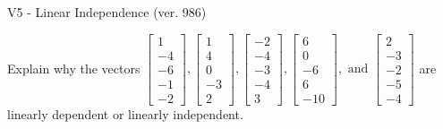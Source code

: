 \begin{exercise}
  \begin{exerciseTitle}V5 - Linear Independence (ver. 986)\end{exerciseTitle}
  \begin{exerciseStatement}
    Explain why the vectors \(\left[\begin{array}{r}
1 \\
-4 \\
-6 \\
-1 \\
-2
\end{array}\right] , \left[\begin{array}{r}
1 \\
4 \\
0 \\
-3 \\
2
\end{array}\right] , \left[\begin{array}{r}
-2 \\
-4 \\
-3 \\
-4 \\
3
\end{array}\right] , \left[\begin{array}{r}
6 \\
0 \\
-6 \\
6 \\
-10
\end{array}\right] , \text{ and } \left[\begin{array}{r}
2 \\
-3 \\
-2 \\
-5 \\
-4
\end{array}\right]\) are linearly dependent or linearly independent.	



\end{exerciseStatement}
\end{exercise}

